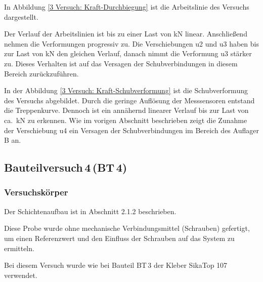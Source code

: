 In Abbildung \ref{3 Versuch: Kraft-Durchbiegung} ist die Arbeitslinie des Versuchs dargestellt.


Der Verlauf der Arbeitslinien ist bis zu einer Last von \unit[50]{kN} linear. Anschließend nehmen die Verformungen progressiv zu. Die Verschiebungen u2 und u3 haben bis zur Last von \unit[56]{kN} den gleichen Verlauf, danach nimmt die Verformung u3 stärker zu. Dieses Verhalten ist auf das Versagen der Schubverbindungen in diesem Bereich zurückzuführen. 

In der Abbildung \ref{3 Versuch: Kraft-Schubverformung} ist die Schubverformung des Versuchs abgebildet. Durch die geringe Auflösung der Messsensoren entstand die Treppenkurve. Dennoch ist ein annähernd linearer Verlauf bis zur Last von ca.\ \unit[50]{kN} zu erkennen. Wie im vorigen Abschnitt beschrieben zeigt die Zunahme der Verschiebung u4 ein Versagen der Schubverbindungen im Bereich des Auflager B an.



\clearpage
\subsection{Bauteilversuch\,4\,(BT\,4)}

\subsubsection{Versuchskörper}

Der Schichtenaufbau ist in Abschnitt 2.1.2 beschrieben. 

Diese Probe wurde ohne mechanische Verbindungsmittel (Schrauben) gefertigt, um einen Referenzwert und den Einfluss der Schrauben auf das System zu ermitteln.

Bei diesem Versuch wurde wie bei Bauteil BT\,3 der Kleber SikaTop 107 verwendet.


